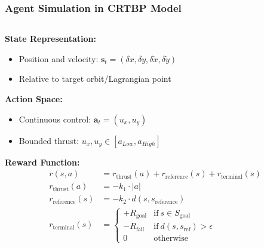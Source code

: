
\begin{frame}
  \frametitle{Agent Simulation in CRTBP Model}
  \begin{columns}[T]
    \begin{column}{0.5\textwidth}
      \small
      \textbf{State Representation:}
      \vspace{-0.2cm}
      \begin{itemize}
        \setlength{\itemsep}{-1pt}
        \item Position and velocity: $\boldsymbol{s}_t = (\delta x, \delta y, \delta \dot{x}, \delta \dot{y})$
        \item Relative to target orbit/Lagrangian point
      \end{itemize}
      \vspace{-0.2cm}
      \textbf{Action Space:}
      \vspace{-0.2cm}
      \begin{itemize}
        \setlength{\itemsep}{-1pt}
        \item Continuous control: $\boldsymbol{a}_t = (u_x, u_y)$
        \item Bounded thrust: $u_x, u_y \in [a_{Low}, a_{High}]$
      \end{itemize}
      \vspace{-0.2cm}

      \textbf{Reward Function:}
      \vspace{-0.2cm}
      \small
      \begin{align*}
        r(s, a) &= r_{\text{thrust}}(a) + r_{\text{reference}}(s) + r_{\text{terminal}}(s) \\[-0ex]
        r_{\text{thrust}}(a) &= -k_1 \cdot |a| \\[-0ex]
        r_{\text{reference}}(s) &= -k_2 \cdot d(s, s_{\text{reference}})\\[-0ex]
        r_{\text{terminal}}(s) &= 
        \begin{cases}
          +R_{\text{goal}} & \text{if} ~ s \in S_{\text{goal}} \\[-0.5ex]
          -R_{\text{fail}} & \text{if} ~ d(s, s_{\text{ref}}) > \epsilon \\[-0.5ex]
          0 & \text{otherwise}
        \end{cases}
      \end{align*}
    \end{column}
    

\end{columns}
\end{frame}

